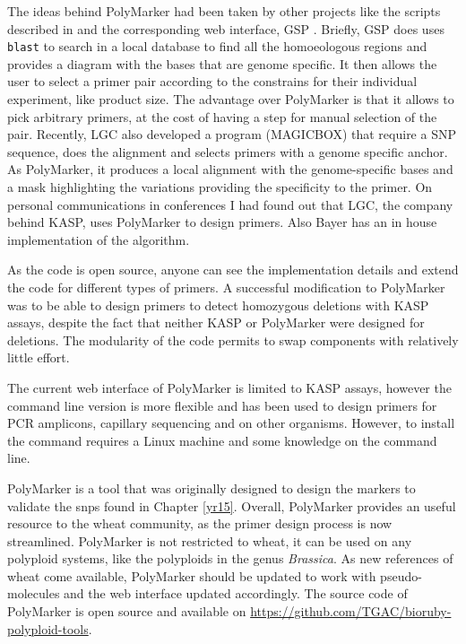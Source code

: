 
The ideas behind PolyMarker had been taken by other projects like the scripts described in \cite{Ma2015} and the corresponding web interface, GSP \citep{Wang2016}. 
Briefly, GSP does uses \verb|blast| to search in a local database to find all the homoeologous regions and provides a diagram with the bases that are genome specific. 
It then allows the user to select a primer pair according to the constrains for their individual experiment, like product size. 
The advantage over PolyMarker is that it allows to pick arbitrary primers, at the cost of having a step for manual selection of the pair. 
Recently, LGC also developed a program (MAGICBOX) that require a SNP sequence, does the alignment and selects primers with a genome specific anchor. 
As PolyMarker, it produces a local alignment with the genome-specific bases \citep{Curry2016} and a mask highlighting the variations providing the specificity to the primer.
On personal communications in conferences I had found out that LGC, the company behind KASP, uses PolyMarker to design primers. Also Bayer has an in house implementation of the algorithm. 

As the code is open source, anyone can see the implementation details and extend the code for different types of primers. 
A successful modification to PolyMarker was to be able to design primers to detect homozygous deletions with KASP assays, despite the fact that neither KASP or PolyMarker were designed for deletions. 
The modularity of the code permits to swap components with relatively little effort. 

The current web interface of PolyMarker is limited to KASP assays, however the command line version is more flexible and has been used to design primers for PCR amplicons, capillary sequencing and on other organisms. 
However, to install the command requires a Linux machine and some knowledge on the command line. 

PolyMarker is a tool that was originally designed to design the markers to validate the \glspl{snp} found in Chapter \ref{yr15}. 
Overall, PolyMarker provides an useful resource to the wheat community, as the primer design process is now streamlined. 
PolyMarker is not restricted to wheat, it can be used on any polyploid systems, like the polyploids in the genus \textit{Brassica}.
As new references of wheat come available, PolyMarker should be updated to work with pseudo-molecules and the web interface updated accordingly. The source code of PolyMarker is open source and available on \url{https://github.com/TGAC/bioruby-polyploid-tools}. 
